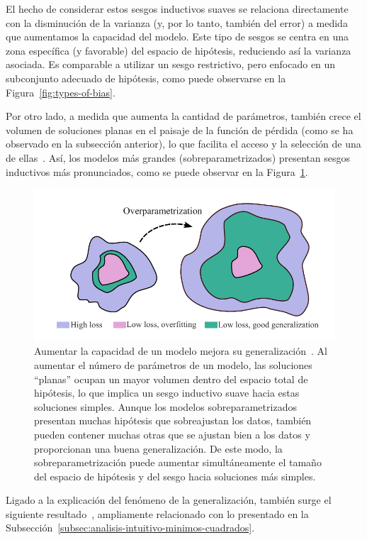 El hecho de considerar estos sesgos inductivos suaves se relaciona directamente con la disminución de la varianza (y, por lo tanto, también del error) a medida que aumentamos la capacidad del modelo. Este tipo de sesgos se centra en una zona específica (y favorable) del espacio de hipótesis, reduciendo así la varianza asociada. Es comparable a utilizar un sesgo restrictivo, pero enfocado en un subconjunto adecuado de hipótesis, como puede observarse en la Figura~\ref{fig:types-of-bias}.\newline

Por otro lado, a medida que aumenta la cantidad de parámetros, también crece el volumen de soluciones planas en el paisaje de la función de pérdida (como se ha observado en la subsección anterior), lo que facilita el acceso y la selección de una de ellas~\cite{Huang2020}. Así, los modelos más grandes (sobreparametrizados) presentan sesgos inductivos más pronunciados, como se puede observar en la Figura~\ref{fig:overparametrization}.\newline

\begin{figure}[h]
    \centering
    \includegraphics[width=0.5\linewidth]{img/overparametrization.png}
    \caption[Aumentar la capacidad de un modelo mejora su generalización~\cite{Wilson2025}.]{Aumentar la capacidad de un modelo mejora su generalización~\cite{Wilson2025}. Al aumentar el número de parámetros de un modelo, las soluciones ``planas'' ocupan un mayor volumen dentro del espacio total de hipótesis, lo que implica un sesgo inductivo suave hacia estas soluciones simples. Aunque los modelos sobreparametrizados presentan muchas hipótesis que sobreajustan los datos, también pueden contener muchas otras que se ajustan bien a los datos y proporcionan una buena generalización. De este modo, la sobreparametrización puede aumentar simultáneamente el tamaño del espacio de hipótesis y del sesgo hacia soluciones más simples.}\label{fig:overparametrization}
\end{figure}

Ligado a la explicación del fenómeno de la generalización, también surge el siguiente resultado~\cite{Maddox2020}, ampliamente relacionado con lo presentado en la Subsección~\ref{subsec:analisis-intuitivo-minimos-cuadrados}.

